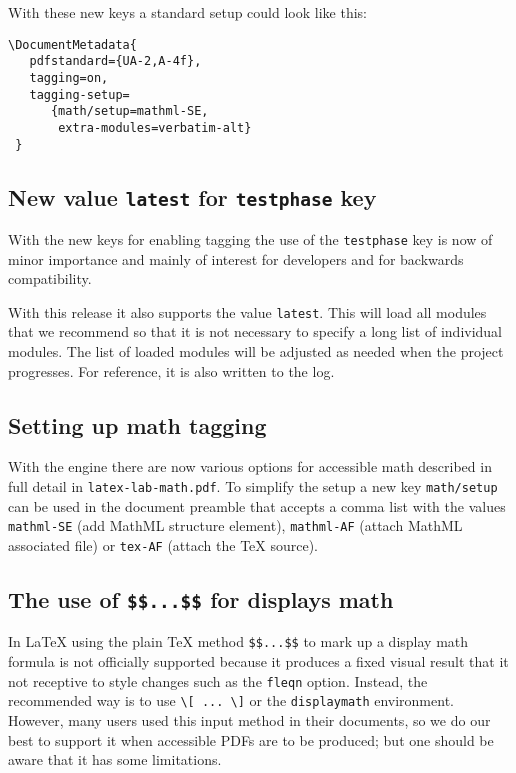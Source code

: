 \documentclass{ltnews}
\providecommand\env[1]{\texttt{#1}}
\providecommand\LuaTeX{\hologo{LuaTeX}}
\providecommand\env[1]{\texttt{#1}}
\begin{document}
With these new keys a standard setup could look like this:
\begin{verbatim}
\DocumentMetadata{
   pdfstandard={UA-2,A-4f},
   tagging=on,
   tagging-setup=
      {math/setup=mathml-SE,
       extra-modules=verbatim-alt}
 }      
\end{verbatim}


\subsection{New value \texttt{latest} for \texttt{testphase} key}

With the new keys for enabling tagging the use of the
\texttt{testphase} key is now of minor importance and mainly of
interest for developers and for backwards compatibility.

With this release it also supports the value \texttt{latest}.  This
will load all modules that we recommend so that it is not necessary to
specify a long list of individual modules. The list of loaded modules
will be adjusted as needed when the project progresses. For reference,
it is also written to the log.



\subsection{Setting up math tagging}

With the \LuaTeX{} engine there are now various options for accessible
math described in full detail in \texttt{latex-lab-math.pdf}. To
simplify the setup a new key \texttt{math/setup} can be used in the
document preamble that accepts a comma list with the values
\texttt{mathml-SE} (add MathML structure element), \texttt{mathml-AF}
(attach MathML associated file) or \texttt{tex-AF} (attach the \TeX{}
source).


\subsection{The use of \texttt{\$\$...\$\$} for displays math}

In \LaTeX{} using the plain \TeX{} method \verb=$$...$$= to mark up a
display math formula is not officially supported because it produces a
fixed visual result that it not receptive to style changes such as the
\texttt{fleqn} option. Instead, the recommended way is to use
\verb=\[ ... \]= or the \env{displaymath} environment. However, many
users used this input method in their documents, so we do our best to
support it when accessible PDFs are to be produced; but one should be
aware that it has some limitations.
\end{document}
